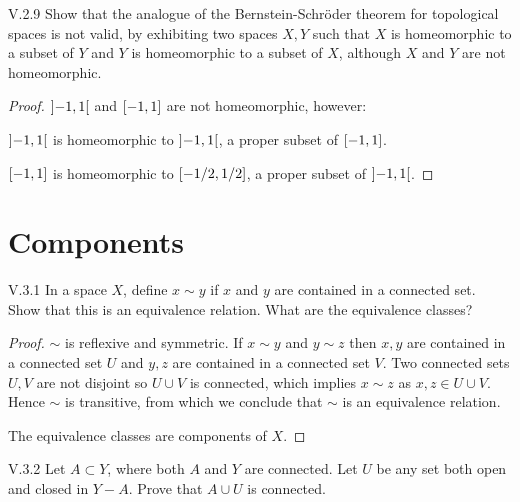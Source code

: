 \begin{problem}{V.2.9}
Show that the analogue of the Bernstein-Schr\"{o}der theorem for topological spaces is not valid, by exhibiting two spaces \( X, Y \) such that \( X \) is homeomorphic to a subset of \( Y \) and \( Y \) is homeomorphic to a subset of \( X \), although \( X \) and \( Y \) are not homeomorphic.
\end{problem}

\begin{proof}
	\( \left\rbrack{-1, 1}\right\lbrack \) and \( \left\lbrack{-1, 1}\right\rbrack \) are not homeomorphic, however:

	\( \left\rbrack{-1, 1}\right\lbrack \) is homeomorphic to \( \left\rbrack{-1, 1}\right\lbrack \), a proper subset of \( \left\lbrack{-1, 1}\right\rbrack \).

	\( \left\lbrack{-1, 1}\right\rbrack \) is homeomorphic to \( \left\lbrack{-1/2, 1/2}\right\rbrack \), a proper subset of \( \left\rbrack{-1, 1}\right\lbrack \).
\end{proof}

\section{Components}

\begin{problem}{V.3.1}
In a space \(X\), define \( x \sim y \) if \( x \) and \( y \) are contained in a connected set. Show that this is an equivalence relation. What are the equivalence classes?
\end{problem}

\begin{proof}
	\( \sim \) is reflexive and symmetric. If \( x \sim y \) and \( y \sim z \) then \( x, y \) are contained in a connected set \( U \) and \( y, z \) are contained in a connected set \( V \). Two connected sets \( U, V \) are not disjoint so \( U \cup V \) is connected, which implies \( x \sim z \) as \( x, z \in U \cup V \). Hence \( \sim \) is transitive, from which we conclude that \( \sim \) is an equivalence relation.

	The equivalence classes are components of \(X\).
\end{proof}

\begin{problem}{V.3.2}
Let \(A \subset Y\), where both \(A\) and \(Y\) are connected. Let \(U\) be any set both open and closed in \(Y - A\). Prove that \( A \cup U \) is connected.
\end{problem}

